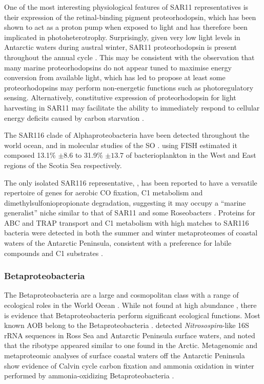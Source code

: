 One of the most interesting physiological features of SAR11 representatives is their expression of the retinal-binding pigment proteorhodopsin, which has been shown to act as a proton pump when exposed to light \cite{Anonymous:2012ck} and has therefore been implicated in photoheterotrophy.
Surprisingly, given very low light levels in Antarctic waters during austral winter, SAR11 proteorhodopsin is present throughout the annual cycle \cite{Williams:2012bs}.
This may be consistent with the observation that many marine proteorhodopsins do not appear tuned to maximise energy conversion from available light, which has led \citet{Fuhrman:2008he} to propose at least some proteorhodopsins may perform non-energetic functions such as photoregulatory sensing.
Alternatively, constitutive expression of proteorhodopsin for light harvesting in SAR11 may facilitate the ability to immediately respond to cellular energy deficits caused by carbon starvation \cite{Steindler:2011hk}.


The SAR116 clade of Alphaproteobacteria have been detected throughout the world ocean, and in molecular studies of the \ac{SO} \cite{West:2008kc,Topping:2006ul}.
 \citet{Topping:2006ul} using \ac{FISH} estimated it composed 13.1\% $\pm 8.6$ to 31.9\% $\pm13.7$ of bacterioplankton in the West and East regions of the Scotia Sea respectively.

The only isolated SAR116 representative, , has been reported to have a versatile repertoire of genes for aerobic CO fixation, C1 metabolism and dimethylsulfoniopropionate degradation, suggesting it may occupy a ``marine generalist'' niche similar to that of SAR11 and some Roseobacters \cite{Oh:2010di}.
Proteins for ABC and TRAP transport and C1 metabolism with high matches to SAR116 bacteria were detected in both the summer and winter metaproteomes of coastal waters of the Antarctic Peninsula, consistent with a preference for labile compounds and C1 substrates \cite{Williams:2012bs}.

\subsubsection{Betaproteobacteria}

The Betaproteobacteria are a large and cosmopolitan class with a range of ecological roles in the World Ocean \citep[reviewed in][]{Kirchman:2008wz}.
While not found at high abundance \cite{Gentile:2006ef,Ghiglione:2011ee,Jamieson:2012up}, there is evidence that Betaproteobacteria perform significant ecological functions.
Most known \ac{AOB} belong to the Betaproteobacteria \cite{Head:1993vt,Teske:1994wt}.
\citet{Hollibaugh:2002em} detected \emph{Nitrosospira}-like 16S rRNA sequences in Ross Sea and Antarctic Peninsula surface waters, and noted that the ribotype appeared similar to one found in the Arctic.
Metagenomic and metaproteomic analyses of surface coastal waters off the Antarctic Peninsula show evidence of Calvin cycle carbon fixation and ammonia oxidation in winter performed by ammonia-oxidizing Betaproteobacteria \cite{Grzymski:2012ej,Williams:2012bs}.

